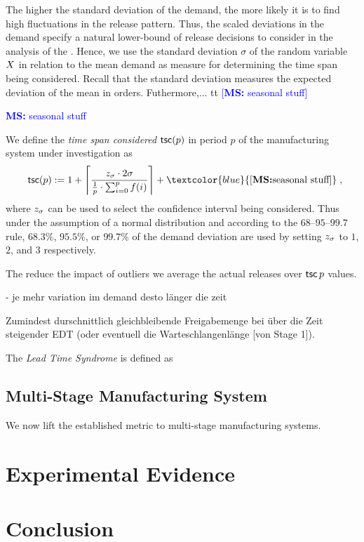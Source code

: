 \documentclass[mnsc]{informs3}
\DeclarePairedDelimiter{\ceil}{\lceil}{\rceil}
\newcommand\MS[2][r]{\ifx t#1 \textcolor{blue}{[\textbf{MS:} #2]}
  \else \begin{center}\textcolor{blue}{\textbf{MS:} #2} \end{center} \fi}
\begin{document}
The higher the standard deviation of the demand, the more likely it is to find high fluctuations in
the release pattern. Thus, the scaled deviations in the demand specify a natural lower-bound of
release decisions to consider in the analysis of the \LTS{}.
%
Hence, we use the standard deviation $\sigma$ of the random variable $X$ in relation to the mean
demand as measure for determining the time span being considered. Recall that the standard deviation
measures the expected deviation of the mean in orders.
%
%
%
Futhermore,... \MS[t]{seasonal stuff}
%


\begin{definition}
  We define the \emph{time span considered} $\operatorname*{\mathsf{tsc}}(p)$ in period $p$ of the manufacturing system
  under investigation as
  \begin{align*}
    \tsc(p) \defsym 1 + \ceil[\Bigg]{\frac{ \zs \cdot 2 \sigma}{\frac{1}{p} \cdot \sum_{i=0}^{p}{f(i)}}} +
    \MS[t]{\text{seasonal stuff}} \tcom
  \end{align*}
  where $z_{\sigma}$ can be used to select the confidence interval being considered. Thus under the
  assumption of a normal distribution and according to the $68$--$95$--$99.7$ rule, $68.3\%$,
  $95.5\%$, or $99.7\%$ of the demand deviation are used by setting $z_{\sigma}$ to $1$, $2$,
  and $3$ respectively.

\end{definition}


The reduce the impact of outliers we average the actual releases over $\operatorname*{\mathsf{tsc}}{p}$ values.


- je mehr variation im demand desto länger die zeit


Zumindest durschnittlich gleichbleibende Freigabemenge bei über die Zeit steigender EDT (oder
eventuell die Warteschlangenlänge [von Stage 1]).


\begin{definition}
  The \emph{Lead Time Syndrome} is defined as
\end{definition}



\subsection{Multi-Stage Manufacturing System}
\label{subsec:Multi-Stage_Manufacturing_System}


We now lift the established metric to multi-stage manufacturing systems.


\section{Experimental Evidence}
\label{sec:Experimental_Evidence}


\section{Conclusion}
\label{sec:Conclusion}




\end{document}
